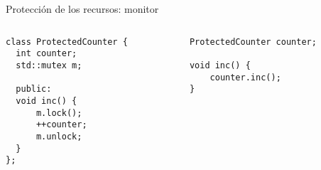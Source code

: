 \begin{frame}[fragile]{Protecci\'on de los recursos: monitor}
   \begin{columns}
      \begin{column}{.5\linewidth}
         \begin{lstlisting}[style=normal33]
class ProtectedCounter {
  int counter;
  std::mutex m;

  public:
  void inc() {
      m.lock();
      ++counter;
      m.unlock;
  }
};
         \end{lstlisting}
      \end{column}
      \begin{column}{.45\linewidth}
         \begin{lstlisting}[style=normal33]
ProtectedCounter counter;

void inc() {
    counter.inc();
}
         \end{lstlisting}
      \end{column}
   \end{columns}
\end{frame}

